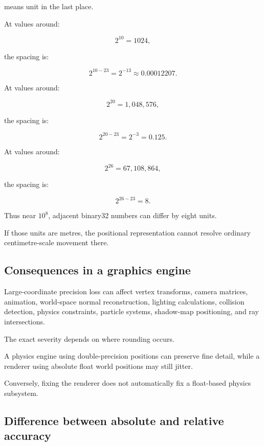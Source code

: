  means unit in the last place.

At values around:

\[
 2^{10}=1024,
\]

the spacing is:

\[
 2^{10-23}=2^{-13} \approx0.00012207.
\]

At values around:

\[
 2^{20}=1{,}048{,}576,
\]

the spacing is:

\[
 2^{20-23}=2^{-3}=0.125.
\]

At values around:

\[
 2^{26}=67{,}108{,}864,
\]

the spacing is:

\[
 2^{26-23}=8.
\]

Thus near \(10^8\), adjacent binary32 numbers can differ by eight units.

If those units are metres, the positional representation cannot resolve ordinary centimetre-scale movement there.

\subsection{Consequences in a graphics engine}\label{02-foundations-ii-ch036-consequences-in-a-graphics-engine}

\hypertarget{02-foundations-ii-ch036-consequences-in-a-graphics-engine}{}

Large-coordinate precision loss can affect vertex transforms, camera matrices, animation, world-space normal reconstruction, lighting calculations, collision detection, physics constraints, particle systems, shadow-map positioning, and ray intersections.

The exact severity depends on where rounding occurs.

A physics engine using double-precision positions can preserve fine detail, while a renderer using absolute float world positions may still jitter.

Conversely, fixing the renderer does not automatically fix a float-based physics subsystem.

\subsection{Difference between absolute and relative accuracy}\label{02-foundations-ii-ch036-difference-between-absolute-and-relative-accuracy}

